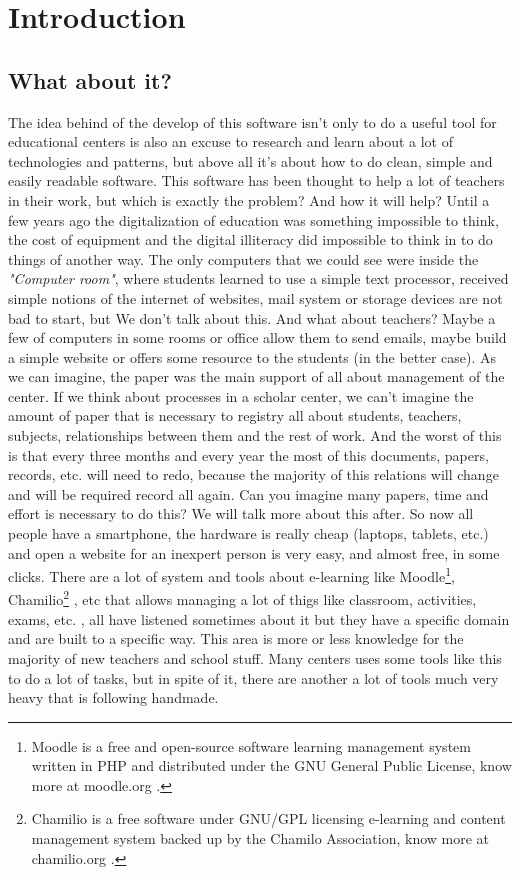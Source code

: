 \chapter{Introduction}
\section{What about it?}
The idea behind of the develop of this software isn't only to do a
useful tool for educational centers is also an excuse to research and
learn about a lot of technologies and patterns, but above all it's
about how to do clean, simple and easily readable software.
\intro
This software has been thought to help a lot of teachers in their
work, but which is exactly the problem? And how it will help?
\intro
Until a few years ago the digitalization of education was something
impossible to think, the cost of equipment and the digital illiteracy
did impossible to think in to do things of another way. The only computers
that we could see were inside the \textit{"Computer room"}, where students learned
to use a simple text processor, received simple notions of the internet
of websites, mail system or storage devices are not bad to start, but
We don't talk about this. And what about teachers? Maybe a few of
computers in some rooms or office allow them to send emails, maybe build
a simple website or offers some resource to the students (in the better case).
As we can imagine, the paper was the main support of all
about management of the center.
\intro
If we think about processes in a scholar center, we can't imagine
the amount of paper that is necessary to registry all about students,
teachers, subjects, relationships between them and the rest of work.
And the worst of this is that every three months and every year the
most of this documents, papers, records, etc. will need to redo, because
the majority of this relations will change and will be required record
all again.
\intro
Can you imagine many papers, time and effort is necessary
to do this? We will talk more about this after.
\intro
So now all people have a smartphone, the hardware is really cheap (laptops,
tablets, etc.) and open a website for an inexpert person is very
easy, and almost free, in some clicks. There are a lot of system and
tools about e-learning like Moodle\footnote{Moodle is a free and open-source
software learning management system written in PHP and distributed under the GNU
General Public License, know more at moodle.org .}, Chamilio\footnote{Chamilio is a free software
under GNU/GPL licensing e-learning and content management system backed up by
the Chamilo Association, know more at chamilio.org .} , etc that allows managing
a lot of thigs like classroom, activities, exams, etc. , all have listened sometimes about it but they have a specific domain and are
built to a specific way.
\intro
This area is more or less knowledge for the majority of new teachers
and school stuff. Many centers uses some tools like this to do a lot
of tasks, but in spite of it, there are another a lot of tools much
very heavy that is following handmade.

